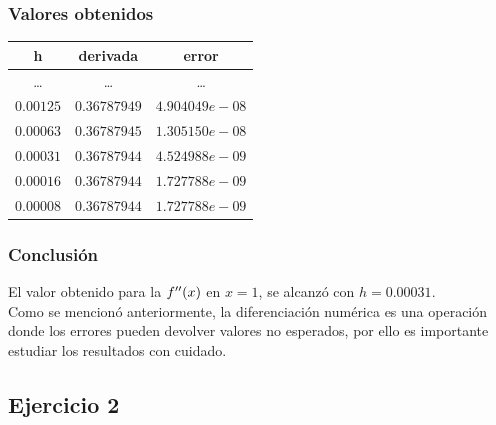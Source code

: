 \documentclass[12pt]{beamer}
\begin{document}
\begin{frame}
\frametitle{Valores obtenidos}
\begin{table}
\renewcommand{\arraystretch}{0.9}
\centering
\begin{tabular}{c c c}\hline
h & derivada & error \\ \hline
\ldots & \ldots & \ldots \\ \hline
$0.00125$ & $0.36787949$ & $4.904049e-08$ \\ \hline
$0.00063$ & $0.36787945$ & $1.305150e-08$ \\ \hline
$0.00031$ & $0.36787944$ & $4.524988e-09$ \\ \hline
$0.00016$ & $0.36787944$ & $1.727788e-09$ \\ \hline
$0.00008$ & $0.36787944$ & $1.727788e-09$ \\ \hline
\end{tabular}    
\end{table}
\end{frame}
\begin{frame}
\frametitle{Conclusión}
El valor obtenido para la ${f}^{\prime \prime} (x)$ en $x = 1$, se alcanzó con $h = 0.00031$.
\\
\bigskip
\pause
Como se mencionó anteriormente, la diferenciación numérica es una operación donde los errores pueden devolver valores no esperados, por ello es importante estudiar los resultados con cuidado.
\end{frame}

\subsection{Ejercicio 2}
\end{document}
